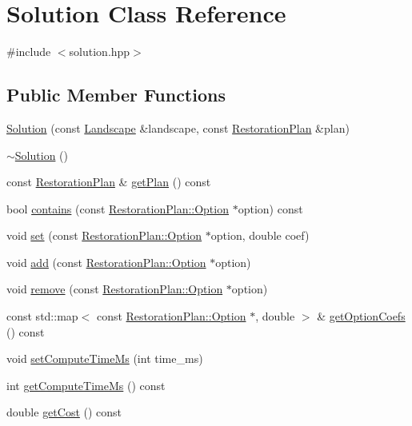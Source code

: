 \hypertarget{class_solution}{}\section{Solution Class Reference}
\label{class_solution}


{\ttfamily \#include $<$solution.\+hpp$>$}

\subsection*{Public Member Functions}
\begin{DoxyCompactItemize}
\item 
\hyperlink{class_solution_ab52c6ac6bed551f63788a5da6af7becc}{Solution} (const \hyperlink{class_landscape}{Landscape} \&landscape, const \hyperlink{class_restoration_plan}{Restoration\+Plan} \&plan)
\item 
\hyperlink{class_solution_a5d245f7409aacf6ace5e965b7879a580}{$\sim$\+Solution} ()
\item 
const \hyperlink{class_restoration_plan}{Restoration\+Plan} \& \hyperlink{class_solution_a95446a3f6110054a0085a22bee9ce64e}{get\+Plan} () const
\item 
bool \hyperlink{class_solution_af4e5cc99508f729e1866e0c30c7472a0}{contains} (const \hyperlink{class_restoration_plan_1_1_option}{Restoration\+Plan\+::\+Option} $\ast$option) const
\item 
void \hyperlink{class_solution_ac29d6eca7b0755057b82c95610b763c8}{set} (const \hyperlink{class_restoration_plan_1_1_option}{Restoration\+Plan\+::\+Option} $\ast$option, double coef)
\item 
void \hyperlink{class_solution_ab9df5a4126b96e12dcb998cb0c5fc37a}{add} (const \hyperlink{class_restoration_plan_1_1_option}{Restoration\+Plan\+::\+Option} $\ast$option)
\item 
void \hyperlink{class_solution_a4388ef028db3bc8e6fd6a6be0478cedc}{remove} (const \hyperlink{class_restoration_plan_1_1_option}{Restoration\+Plan\+::\+Option} $\ast$option)
\item 
const std\+::map$<$ const \hyperlink{class_restoration_plan_1_1_option}{Restoration\+Plan\+::\+Option} $\ast$, double $>$ \& \hyperlink{class_solution_a4b97ae617451a4e255179ac1e80eb45e}{get\+Option\+Coefs} () const
\item 
void \hyperlink{class_solution_a24101fa88cf1e685abd9652148e4f1fb}{set\+Compute\+Time\+Ms} (int time\+\_\+ms)
\item 
int \hyperlink{class_solution_a7b42da29828c80b924884729cdcd9b43}{get\+Compute\+Time\+Ms} () const
\item 
double \hyperlink{class_solution_ad4f76bea091ec66302df270168e68feb}{get\+Cost} () const
\end{DoxyCompactItemize}
